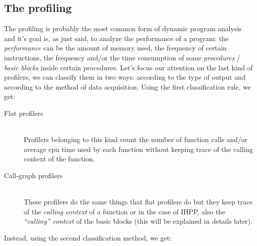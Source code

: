 \documentclass[a4paper,11pt]{report}
\begin{document}
\subsection{The profiling}
The profiling is probably the most common form of dynamic program analysis and it's goal is, as just said, to analyze the performance of a program: the \emph{performance} can be the amount of memory used, the frequency of certain instructions, the frequency and/or the time consumption of some \emph{procedures} / \emph{basic blocks} inside certain procedures. Let's focus our attention on the last kind of profilers, we can classify them in two ways: according to the type of output and according to the method of data acquisition. Using the first classification rule, we get:

\begin{description}
\item[Flat profilers] \hfill \\
Profilers belonging to this kind count the number of function calls and/or average cpu time used by each function without keeping trace of the calling context of the function.
\item[Call-graph profilers] \hfill \\
These profilers do the same things that flat profilers do but they keep trace of the \emph{calling context} of a function or in the case of IHPP, also the \emph{``calling'' context} of the basic blocks (this will be explained in details later).
\end{description}

\begin{flushleft}
Instead, using the second classification method, we get:
\end{flushleft}
\end{document}
